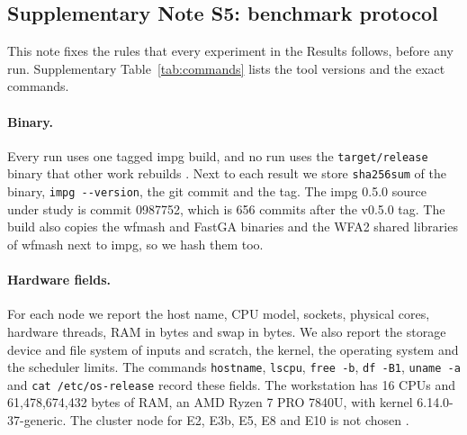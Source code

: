 \subsection*{Supplementary Note S5: benchmark protocol}

This note fixes the rules that every experiment in the Results follows, before any run.
Supplementary Table~\ref{tab:commands} lists the tool versions and the exact commands.

\paragraph{Binary.}
Every run uses one tagged impg build, and no run uses the \texttt{target/release} binary that other work rebuilds .
Next to each result we store \texttt{sha256sum} of the binary, \texttt{impg -{}-version}, the git commit and the tag.
The impg 0.5.0 source under study is commit 0987752, which is 656 commits after the v0.5.0 tag.
The build also copies the wfmash and FastGA binaries and the WFA2 shared libraries of wfmash next to impg, so we hash them too.

\paragraph{Hardware fields.}
For each node we report the host name, CPU model, sockets, physical cores, hardware threads, RAM in bytes and swap in bytes.
We also report the storage device and file system of inputs and scratch, the kernel, the operating system and the scheduler limits.
The commands \texttt{hostname}, \texttt{lscpu}, \texttt{free -b}, \texttt{df -B1}, \texttt{uname -a} and \texttt{cat /etc/os-release} record these fields.
The workstation has 16 CPUs and 61,478,674,432 bytes of RAM, an AMD Ryzen 7 PRO 7840U, with kernel 6.14.0-37-generic.
The cluster node for E2, E3b, E5, E8 and E10 is not chosen .

